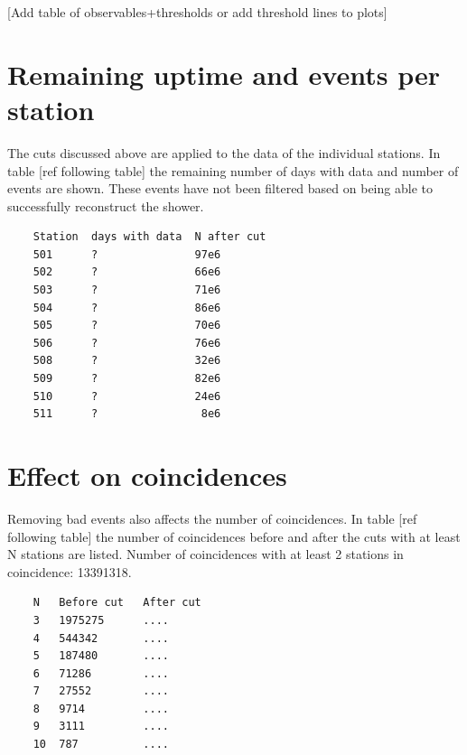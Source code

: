 [Add table of observables+thresholds or add threshold lines to plots]


\section{Remaining uptime and events per station}

The cuts discussed above are applied to the data of the individual stations. In table [ref following table] the remaining number of days with data and number of events are shown. These events have not been filtered based on being able to successfully reconstruct the shower.

\begin{verbatim}
    Station  days with data  N after cut
    501      ?               97e6
    502      ?               66e6
    503      ?               71e6
    504      ?               86e6
    505      ?               70e6
    506      ?               76e6
    508      ?               32e6
    509      ?               82e6
    510      ?               24e6
    511      ?                8e6
\end{verbatim}


\section{Effect on coincidences}

Removing bad events also affects the number of coincidences. In table [ref following table] the number of coincidences before and after the cuts with at least N stations are listed. Number of coincidences with at least 2 stations in coincidence: 13391318.

\begin{verbatim}
    N   Before cut   After cut
    3   1975275      ....
    4   544342       ....
    5   187480       ....
    6   71286        ....
    7   27552        ....
    8   9714         ....
    9   3111         ....
    10  787          ....
\end{verbatim}
